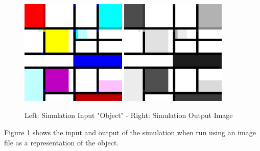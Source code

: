 \documentclass[12pt]{article}
\begin{document}
\begin{figure}[ht]
	\centering
	\includegraphics[width=0.45\textwidth]{testimg}
	\hfill
	\includegraphics[width=0.45\textwidth]{testoutput}
	\caption{Left: Simulation Input "Object" - Right: Simulation Output Image}
	\label{fig:sim-in-out}
\end{figure}

Figure \ref{fig:sim-in-out} shows the input and output of the simulation when run using an image file as a representation of the object.
\end{document}
